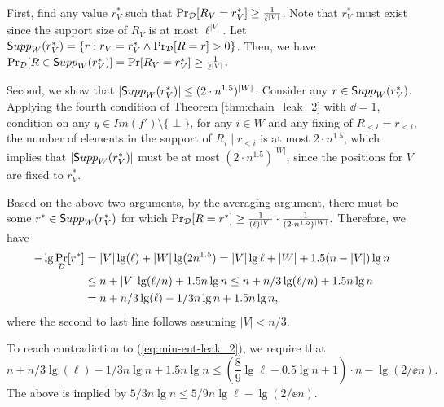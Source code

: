 First, find any value $r^*_V$ such that $\Pr_{\mathcal{{\cal D}}}[R_V =r^*_V]
\geq \frac{1}{\ell^{|V|}}$. 
Note that $r^*_V$ must exist since the support size
of $R_V$ is at most $\ell^{|V|}$.
%
Let 
$ {\mathsf Supp}_W(r^*_V) = \{r: r_V = r^*_V \wedge \Pr_{\mathcal{{\cal D}}}[R = r] > 0 \}$. 
Then, we have 
$
\Pr_{{\cal D}}[R \in {\mathsf Supp}_W(r^*_V)] 
= \Pr[R_V = r^*_V] 
\geq \frac{1}{\ell^{|V|}}.
$

Second, we show that $|{\mathsf Supp}_W(r^*_V)| \le (2 \cdot n^{1.5})^{|W|}$. 
Consider any $r \in {\mathsf Supp}_W(r^*_V)$. 
Applying the fourth condition of Theorem \ref{thm:chain_leak_2} with $\dd = 1$, condition on any $y\in Im(f')\setminus\{\perp\}$, for any $i \in W$
and any fixing of $R_{< i} = r_{< i}$, the number of 
elements in the support of $R_i \mid r_{< i}$ is at most
$2 \cdot n^{1.5}$,
which implies that $|{\mathsf Supp}_W(r^*_V)|$ must be at most $(2 \cdot n^{1.5})^{|W|}$, since the positions for $V$ are fixed to $r^*_V$. 

Based on the above two arguments, by the averaging argument, there must be some $r^* \in {\mathsf Supp}_W(r^*_V)$
for which 
$
\Pr_{\mathcal{{\cal D}}}[R = r^*]
\geq \frac{1}{(\ell)^{|V|}} \cdot \frac{1}{(2 \cdot n^{1.5})^{|W|}}.$
%
Therefore, we have 
\begin{align*}
-\lg \Pr_{{\cal D}}[r^*] & = 
|V| \lg (\ell) + |W| \lg (2 n^{1.5})  
=  |V| \lg \ell + |W| + 1.5 (n-|V|) \lg n \\
& \leq  n + |V| \lg (\ell/n) + 1.5 n \lg n 
\leq  n + n/3 \lg (\ell/n) + 1.5 n \lg n \\
& = n + n/3 \lg (\ell) - 1/3 n \lg n + 1.5 n \lg n, 
\end{align*}
where the second to last line follows assuming
$|V| < n/3$.

To reach contradiction to (\ref{eq:min-ent-leak_2}), we require that 
\[
n + n/3 \lg (\ell) - 1/3 n \lg n + 1.5 n \lg n \leq 
\left(\frac{8}{9} \lg \ell - 0.5 \lg n + 1 \right) \cdot n - \lg (2/\ee n).
\]
The above is implied by
$
5/3 n \lg n \leq 5/9 n \lg \ell - \lg (2/\ee n).$

